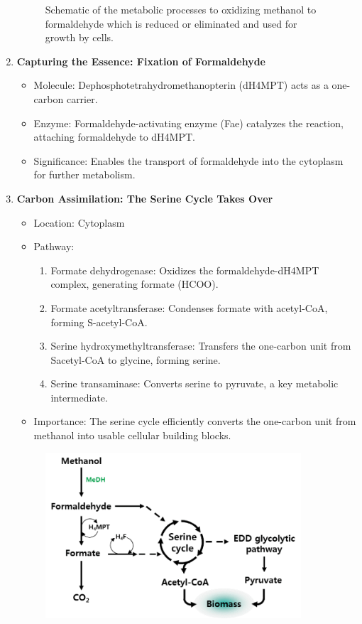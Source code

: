 \begin{enumerate}
\begin{figure}[H]
        \caption{Schematic of the metabolic processes to oxidizing methanol to formaldehyde which is reduced or eliminated and used for growth by cells.}
        \label{fig:mextorquens_metabolism_methanol}
    \end{figure}
    \item \textbf{Capturing the Essence: Fixation of Formaldehyde}
    \begin{itemize}
        \item Molecule: Dephosphotetrahydromethanopterin (dH4MPT) acts as a one-carbon
        carrier.
        \item Enzyme: Formaldehyde-activating enzyme (Fae) catalyzes the reaction, attaching
        formaldehyde to dH4MPT.
        \item Significance: Enables the transport of formaldehyde into the cytoplasm for
        further metabolism.
    \end{itemize}
    \item \textbf{Carbon Assimilation: The Serine Cycle Takes Over}
    \begin{itemize}
        \item Location: Cytoplasm
        \item Pathway:
        \begin{enumerate}
            \item Formate dehydrogenase:
            Oxidizes the formaldehyde-dH4MPT complex, generating formate (HCOO).
            \item Formate acetyltransferase:
            Condenses formate with acetyl-CoA, forming S-acetyl-CoA.
            \item Serine hydroxymethyltransferase: Transfers the one-carbon unit from Sacetyl-CoA to glycine, forming serine.
            \item Serine transaminase: Converts serine to pyruvate, a key metabolic
            intermediate.
        \end{enumerate}
        \item Importance: The serine cycle efficiently converts the one-carbon unit from
        methanol into usable cellular building blocks.
    \end{itemize}
    \begin{figure}[H]
        \centering
        \includegraphics[width=0.9\textwidth]{./media/images/mextorquens_metabolizing_methanol}

\end{figure}
\end{enumerate}
